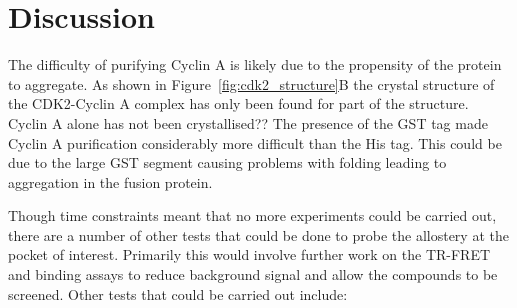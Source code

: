 \section{Discussion}

The difficulty of purifying Cyclin A is likely due to the propensity of the protein to aggregate.
As shown in Figure~\ref{fig:cdk2_structure}B the crystal structure of the CDK2-Cyclin A complex has only been found for part of the structure.
Cyclin A alone has not been crystallised??
The presence of the GST tag made Cyclin A purification considerably more difficult than the His tag.
This could be due to the large GST segment causing problems with folding leading to aggregation in the fusion protein.

Though time constraints meant that no more experiments could be carried out, there are a number of other tests that could be done to probe the allostery at the pocket of interest.
Primarily this would involve further work on the TR-FRET and binding assays to reduce background signal and allow the compounds to be screened.
Other tests that could be carried out include:

